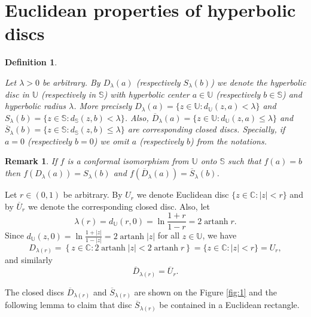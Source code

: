 \documentclass{amsart}
\newcommand{\artanh}{\mathop{\mathrm{artanh}}}
\newtheorem{remark}{Remark}
\newtheorem{definition}{Definition}
\begin{document}
\section{Euclidean properties of hyperbolic discs}
\begin{definition}\label{def1}

Let $\lambda>0$ be arbitrary. By $D_{\lambda}(a)$ (respectively $S_{\lambda}(b)$) we denote the hyperbolic disc in $\mathbb{U}$ (respectively in $\mathbb{S}$) with hyperbolic center $a\in\mathbb{U}$ (respectively $b\in\mathbb{S}$) and hyperbolic radius $\lambda$. More precisely $D_{\lambda}(a)=\{z\in\mathbb{U}:d_{\mathbb{U}}(z,a)<\lambda\}$ and $S_{\lambda}(b)=\{z\in\mathbb{S}:d_{\mathbb{S}}(z,b)<\lambda\}$. Also, $\overline{D}_{\lambda}(a)=\{z\in\mathbb{U}:d_{\mathbb{U}}(z,a)\leqslant\lambda\}$ and $\overline{S}_{\lambda}(b)=\{z\in\mathbb{S}:d_{\mathbb{S}}(z,b)\leqslant\lambda\}$ are corresponding closed discs.  Specially, if $a=0$ (respectively $b=0$) we omit  $a$ (respectively $b$) from the notations.
\end{definition}

\begin{remark}
If $f$ is a conformal isomorphism from $\mathbb{U}$ onto $\mathbb{S}$ such that $f(a)=b$ then $f(D_{\lambda}(a))=S_{\lambda}(b)$ and $f(\overline{D}_{\lambda}(a))=\overline{S}_{\lambda}(b)$.
\end{remark}

Let $r\in(0,1)$ be arbitrary. By $U_r$ we denote Euclidean disc $\{z\in\mathbb{C}: |z|<r\}$ and by $\overline{U}_r$ we denote the corresponding closed disc. Also, let
\begin{equation*}
    \lambda(r)=d_{\mathbb{U}}(r,0)=\ln\frac{1+r}{1-r}=2\artanh{r}.
\end{equation*}
Since $\displaystyle d_{\mathbb{U}}(z,0)=\ln\frac{1+|z|}{1-|z|}=2\artanh{|z|}$ for all $z\in\mathbb{U}$, we have
\begin{equation*}
    D_{\lambda(r)}=\left\{z\in\mathbb{C}:2\artanh{|z|}<2\artanh{r}\right\}=\{z\in\mathbb{C}:|z|<r\}=U_r,
\end{equation*}
and similarly
\begin{equation*}
    \overline{D}_{\lambda(r)}=\overline{U}_r.
\end{equation*}


The closed discs $\overline{D}_{\lambda(r)}$ and $\overline{S}_{\lambda(r)}$ are shown on the Figure \ref{fig:1} and the following lemma to claim that disc $\overline{S}_{\lambda(r)}$ be contained in a Euclidean rectangle.
\end{document}
